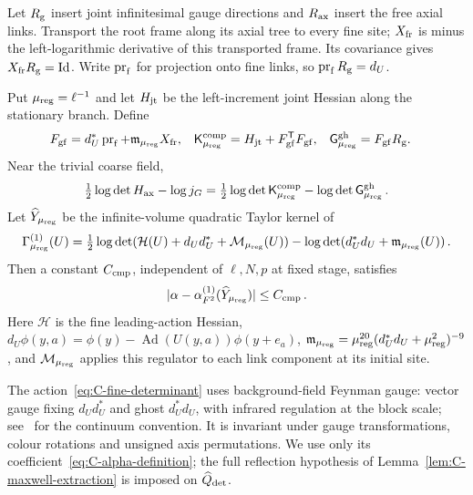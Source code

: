 Let $R_{\rm g}$ insert joint infinitesimal gauge directions and $R_{\rm ax}$ insert the free axial links. Transport the root frame along its axial tree to every fine site; $X_{\rm fr}$ is minus the left-logarithmic derivative of this transported frame. Its covariance gives $X_{\rm fr}R_{\rm g}=\mathrm{Id}$. Write $\operatorname{pr}_{\rm f}$ for projection onto fine links, so $\operatorname{pr}_{\rm f}R_{\rm g}=d_U$.

\begin{lemma}\label{lem:C-determinant}
Put $\mu_{\rm reg}=\ell^{-1}$ and let $H_{\rm jt}$ be the left-increment joint Hessian along the stationary branch. Define
\begin{align*}
 F_{\rm gf}&=d_U^*\operatorname{pr}_{\rm f}+\mathfrak m_{\mu_{\rm reg}}X_{\rm fr},&
 \mathsf K^{\rm comp}_{\mu_{\rm reg}}&=H_{\rm jt}+F_{\rm gf}^{\mathsf T}F_{\rm gf},&
 \mathsf G^{\rm gh}_{\mu_{\rm reg}}&=F_{\rm gf}R_{\rm g}.
\end{align*}
Near the trivial coarse field,
\begin{equation}\label{eq:C-faddeev-popov}
 \tfrac12\log\det H_{\rm ax}-\log j_G
 =\tfrac12\log\det\mathsf K^{\rm comp}_{\mu_{\rm reg}}-\log\det\mathsf G^{\rm gh}_{\mu_{\rm reg}}\,.
\end{equation}
Let $\widehat Y_{\mu_{\rm reg}}$ be the infinite-volume quadratic Taylor kernel of
\begin{equation}\label{eq:C-fine-determinant}
 \Gamma^{(1)}_{\mu_{\rm reg}}(U)
 =\tfrac12\log\det(\mathcal H(U)+d_Ud_U^*+\mathcal M_{\mu_{\rm reg}}(U))
 -\log\det(d_U^*d_U+\mathfrak m_{\mu_{\rm reg}}(U))\,.
\end{equation}
Then a constant $C_{\rm cmp}$, independent of $\ell,N,p$ at fixed stage, satisfies
\begin{equation}\label{eq:C-determinant-comparison}
 |\alpha-\alpha^{(1)}_{F^2}(\widehat Y_{\mu_{\rm reg}})|\le C_{\rm cmp}\,.
\end{equation}
Here $\mathcal H$ is the fine leading-action Hessian, $d_U\phi(y,a)=\phi(y)-\operatorname{Ad}(U(y,a))\phi(y+e_a)$, $\mathfrak m_{\mu_{\rm reg}}=\mu_{\rm reg}^{20}(d_U^*d_U+\mu_{\rm reg}^2)^{-9}$, and $\mathcal M_{\mu_{\rm reg}}$ applies this regulator to each link component at its initial site.
\end{lemma}

The action~\eqref{eq:C-fine-determinant} uses background-field Feynman gauge: vector gauge fixing $d_Ud_U^*$ and ghost $d_U^*d_U$, with infrared regulation at the block scale; see~\cite{Abbott1982} for the continuum convention. It is invariant under gauge transformations, colour rotations and unsigned axis permutations. We use only its coefficient~\eqref{eq:C-alpha-definition}; the full reflection hypothesis of Lemma~\ref{lem:C-maxwell-extraction} is imposed on $\widehat Q_{\rm det}$.

